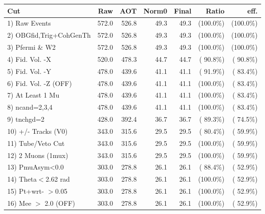  \begin{table}[h!]\centering
 \begin{tabular}{||l||r|r|r|r|r|r||}
 \hline
 \hline
 Cut & Raw & AOT & Norm0 & Final & Ratio & eff.       \\
 \hline
  1) Raw Events           &        572.0 &        526.8 &         49.3 &         49.3 & (100.0\%) & (100.0\%) \\
  2) OBGfid,Trig+CohGenTh &        572.0 &        526.8 &         49.3 &         49.3 & (100.0\%) & (100.0\%) \\
  3) Pfermi \& W2         &        572.0 &        526.8 &         49.3 &         49.3 & (100.0\%) & (100.0\%) \\
  4) Fid. Vol. -X         &        520.0 &        478.3 &         44.7 &         44.7 & ( 90.8\%) & ( 90.8\%) \\
  5) Fid. Vol. -Y         &        478.0 &        439.6 &         41.1 &         41.1 & ( 91.9\%) & ( 83.4\%) \\
  6) Fid. Vol. -Z (OFF)   &        478.0 &        439.6 &         41.1 &         41.1 & (100.0\%) & ( 83.4\%) \\
  7) At Least 1 Mu        &        478.0 &        439.6 &         41.1 &         41.1 & (100.0\%) & ( 83.4\%) \\
  8) ncand=2,3,4          &        478.0 &        439.6 &         41.1 &         41.1 & (100.0\%) & ( 83.4\%) \\
  9) tnchgd=2             &        428.0 &        392.4 &         36.7 &         36.7 & ( 89.3\%) & ( 74.5\%) \\
 10) +/- Tracks (V0)      &        343.0 &        315.6 &         29.5 &         29.5 & ( 80.4\%) & ( 59.9\%) \\
 11) Tube/Veto Cut        &        343.0 &        315.6 &         29.5 &         29.5 & (100.0\%) & ( 59.9\%) \\
 12) 2 Muons (1mux)       &        343.0 &        315.6 &         29.5 &         29.5 & (100.0\%) & ( 59.9\%) \\
 13) PmuAsym<0.0          &        303.0 &        278.8 &         26.1 &         26.1 & ( 88.4\%) & ( 52.9\%) \\
 14) Theta$<$2.62 rad     &        303.0 &        278.8 &         26.1 &         26.1 & (100.0\%) & ( 52.9\%) \\
 15) Pt+wrt- $>$0.05      &        303.0 &        278.8 &         26.1 &         26.1 & (100.0\%) & ( 52.9\%) \\
 16) Mee $>$ 2.0  (OFF)   &        303.0 &        278.8 &         26.1 &         26.1 & (100.0\%) & ( 52.9\%) \\

\end{tabular}
\end{table}
